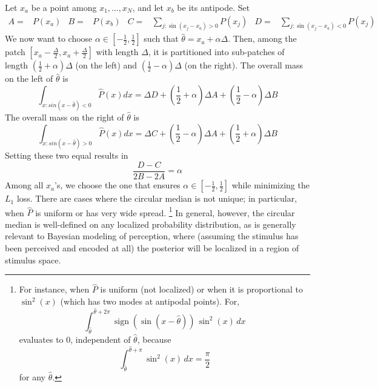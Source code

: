 Let $x_a$ be a point among $x_1, \dots, x_N$, and let $x_b$ be its antipode.
Set
\begin{align*}
    A =& P(x_a) &
    B =& P(x_b) &
    C =& \sum_{j : \sin(x_j-x_a) > 0} P(x_j)&
    D =& \sum_{j : \sin(x_j-x_a) < 0} P(x_j)
\end{align*}
We now want to choose $\alpha \in [-\frac{1}{2},\frac{1}{2}]$ such that $\widehat{\theta} = x_a + \alpha\Delta$.
Then, among the patch $[x_a-\frac{\Delta}{2}, x_a+\frac{\Delta}{2}]$ with length $\Delta$, it is partitioned into sub-patches of length $(\frac{1}{2}+\alpha) \Delta$ (on the left) and $(\frac{1}{2}-\alpha) \Delta$ (on the right).
The overall mass on the left of $\widehat{\theta}$ is
\begin{equation}
  \int_{x : sin(x-\widehat{\theta}) < 0} \widehat{P}(x) dx =  \Delta D + \left(\frac{1}{2}+\alpha\right) \Delta A + \left(\frac{1}{2}-\alpha\right) \Delta B
\end{equation}
The overall mass on the right of $\widehat{\theta}$ is
\begin{equation}
  \int_{x : sin(x-\widehat{\theta}) > 0} \widehat{P}(x) dx =  \Delta C + \left(\frac{1}{2}-\alpha\right) \Delta A + \left(\frac{1}{2}+\alpha\right) \Delta B
\end{equation}
Setting these two equal results in
\begin{equation}\label{eq:median-alpha}
    \frac{D -C}{2B-2A} =   \alpha
\end{equation}
Among all $x_a$'s, we choose the one that ensures $\alpha \in [-\frac{1}{2}, \frac{1}{2}]$ while minimizing the $L_1$ loss. There are cases where the circular median is not unique; in particular, when $\widehat{P}$ is uniform or has very wide spread. 
\footnote{For instance, when $\widehat{P}$ is uniform (not localized) or when it is proportional to $\sin^2(x)$ (which has two modes at antipodal points).
For, 
\[
\int_{\widehat{\theta}}^{\widehat{\theta}+2\pi} \operatorname{sign}(\sin(x-\widehat{\theta}))\,\sin^2(x)\,dx
\]
evaluates to \(0\), independent of \(\widehat{\theta}\), because 
\[
\int_{\widehat{\theta}}^{\widehat{\theta}+\pi} \sin^2(x)\,dx = \frac{\pi}{2}
\] for any $\widehat{\theta}$.
}
In general, however, the circular median is well-defined on any  localized probability distribution, as is generally relevant to Bayesian modeling of perception, where (assuming the stimulus has been perceived and encoded at all) the posterior will be localized in a region of stimulus space. 
